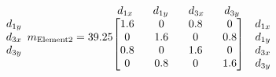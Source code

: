 \documentclass{article}
\begin{document}
\begin{math}
\begin{matrix}
\begin{matrix}
            d_{1y}\\
            d_{3x}\\
            d_{3y}\\
            \end{matrix}
        \end{matrix}
        \newline
        m_{\text{Element2}}=39.25
        \begin{matrix}
            \begin{matrix}
            d_{1x}&\;\;\;d_{1y}&\;\;\;d_{3x}&\;\;\;d_{3y}\\
            \end{matrix}\\
            \begin{bmatrix}
            1.6&\;\;\;0&\;\;\;0.8&\;\;\;0\\
            0&\;\;\;1.6&\;\;\;0&\;\;\;0.8\\
            0.8&\;\;\;0&\;\;\;1.6&\;\;\;0\\
            0&\;\;\;0.8&\;\;\;0&\;\;\;1.6\\
            \end{bmatrix}&
            \begin{matrix}
            d_{1x}\\
            d_{1y}\\
            d_{3x}\\
            d_{3y}\\
            \end{matrix}
        \end{matrix}
    \end{math}
\end{document}
